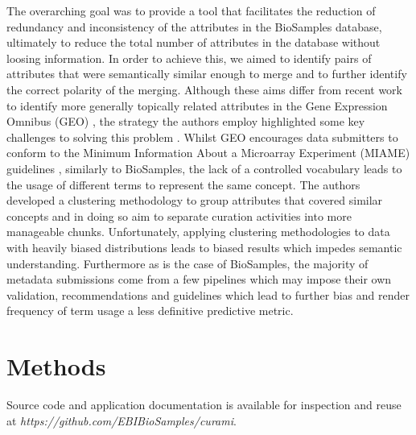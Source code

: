 \documentclass{bmcart}
\begin{document}
The overarching goal was to provide a tool that facilitates the reduction of redundancy and inconsistency of the attributes in the BioSamples database, ultimately to reduce the total number of attributes in the database without loosing information. In order to achieve this, we aimed to identify pairs of attributes that were semantically similar enough to merge and to further identify the correct polarity of the merging. Although these aims differ from recent work to identify more generally topically related attributes in the Gene Expression Omnibus (GEO) \cite{edgar2002gene, barrett2012ncbi}, the strategy the authors employ highlighted some key challenges to solving this problem \cite{hu2017cleaning}. Whilst GEO encourages data submitters to conform to the Minimum Information About a Microarray Experiment (MIAME) guidelines \cite{brazma2001minimum}, similarly to BioSamples, the lack of a controlled vocabulary leads to the usage of different terms to represent the same concept. The authors developed a clustering methodology to group attributes that covered similar concepts and in doing so aim to separate curation activities into more manageable chunks. Unfortunately, applying clustering methodologies to data with heavily biased distributions leads to biased results which impedes semantic understanding. Furthermore as is the case of BioSamples, the majority of metadata submissions come from a few pipelines which may impose their own validation, recommendations and guidelines which lead to further bias and render frequency of term usage a less definitive predictive metric.


\section*{Methods}

Source code and application documentation is available for inspection and reuse at \textit{https://github.com/EBIBioSamples/curami}.
\end{document}

